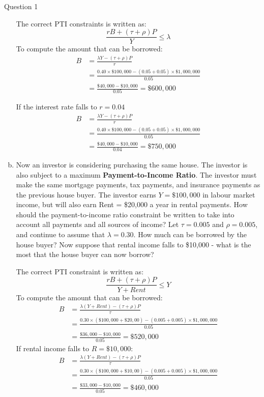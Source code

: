 \documentclass[a4paper]{article}
\newif\IfInSansMode
\begin{document}
\begin{questionbox}{Question 1}
\begin{enumerate}[(a)]
			\begin{explanationbox}
				The correct PTI constraints is written as:
				\[
					\frac{rB+(\tau+\rho)P}{Y} \leq \lambda
				\]
				To compute the amount that can be borrowed:
				\begin{align*}
					B &= \frac{\lambda Y - (\tau+\rho)P}{r}\\
					&= \frac{0.40\times\$100,000-(0.05+0.05)\times\$1,000,000}{0.05}\\
					&=\frac{\$40,000-\$10,000}{0.05} = \$600,000
				\end{align*}
		
				If the interest rate falls to \( r=0.04 \)
				\begin{align*}
					B &= \frac{\lambda Y - (\tau+\rho)P}{r}\\
					&= \frac{0.40\times\$100,000-(0.05+0.05)\times\$1,000,000}{0.05}\\
					&=\frac{\$40,000-\$10,000}{0.04} = \$750,000
				\end{align*}
			\end{explanationbox}
			\item Now an investor is considering purchasing the same house. The investor is also subject to a maximum \textbf{Payment-to-Income Ratio}. The investor must make the same mortgage payments, tax payments, and insurance payments as the previous house buyer. The investor earns \( Y = \$100,000 \) in labour market income, but will also earn Rent = \$20,000 a year in rental payments. How should the payment-to-income ratio constraint be written to take into account all payments and all sources of income? Let \( \tau = 0.005 \) and \( \rho = 0.005 \), and continue to assume that \( \lambda = 0.30 \). How much can be borrowed by the house buyer? Now suppose that rental income falls to \$10,000 - what is the most that the house buyer can now borrow?
			\begin{explanationbox}
				The correct PTI constraint is written as:
				\[
					\frac{rB+(\tau+\rho)P}{Y + Rent} \leq Y
				\]
				To compute the amount that can be borrowed:
				\begin{align*}
					B &= \frac{\lambda(Y+Rent)-(\tau+\rho)P}{\tau} \\
					&= \frac{0.30\times(\$100,000+\$20,00)-(0.005+0.005)\times\$1,000,000}{0.05} \\
					&= \frac{\$36,000-\$10,000}{0.05} = \$520,000
				\end{align*}
				If rental income falls to \( R=\$10,000 \):
				\begin{align*}
					B &= \frac{\lambda(Y+Rent)-(\tau+\rho)P}{\tau} \\
					&= \frac{0.30\times(\$100,000+\$10,00)-(0.005+0.005)\times\$1,000,000}{0.05} \\
					&= \frac{\$33,000-\$10,000}{0.05} = \$460,000
				\end{align*}
			\end{explanationbox}
		\end{enumerate}
	\end{questionbox}
\end{document}
